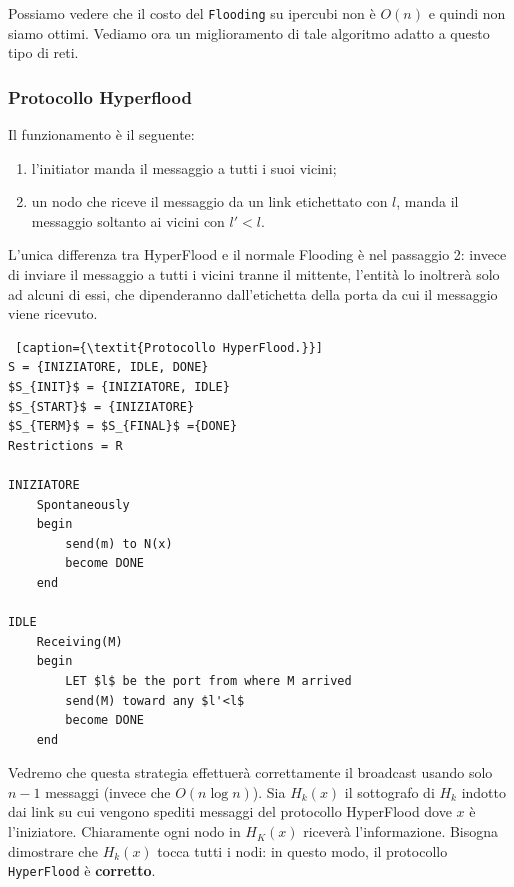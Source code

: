 Possiamo vedere che il costo del \texttt{Flooding} su ipercubi non è $O(n)$ e quindi non siamo ottimi. Vediamo ora un miglioramento di tale algoritmo adatto a questo tipo di reti. 

\subsubsection{Protocollo Hyperflood}
Il funzionamento è il seguente:
\begin{enumerate}
  \item l'initiator manda il messaggio a tutti i suoi vicini;
  \item un nodo che riceve il messaggio da un link etichettato con $l$, manda il messaggio soltanto ai vicini con $l' < l$.
\end{enumerate}
L'unica differenza tra HyperFlood e il normale Flooding è nel passaggio 2: invece di inviare il messaggio a tutti i vicini tranne il mittente, l'entità lo inoltrerà solo ad alcuni di essi, che dipenderanno dall'etichetta della porta da cui il messaggio viene ricevuto.

\begin{lstlisting} [caption={\textit{Protocollo HyperFlood.}}]
S = {INIZIATORE, IDLE, DONE}
$S_{INIT}$ = {INIZIATORE, IDLE}
$S_{START}$ = {INIZIATORE}
$S_{TERM}$ = $S_{FINAL}$ ={DONE}
Restrictions = R

INIZIATORE
    Spontaneously
    begin
        send(m) to N(x)
        become DONE
    end

IDLE
    Receiving(M)
    begin
        LET $l$ be the port from where M arrived
        send(M) toward any $l'<l$
        become DONE 
    end
\end{lstlisting}

Vedremo che questa strategia effettuerà correttamente il broadcast usando solo $n-1$ messaggi (invece che $O(n \log n)$).
Sia $H_k(x)$ il sottografo di $H_k$ indotto dai link su cui vengono spediti messaggi del protocollo HyperFlood dove $x$ è l'iniziatore. Chiaramente ogni nodo in $H_K(x)$ riceverà l'informazione. Bisogna dimostrare che $H_k(x)$ tocca tutti i nodi: in questo modo, il protocollo \texttt{HyperFlood} è \textbf{corretto}.

